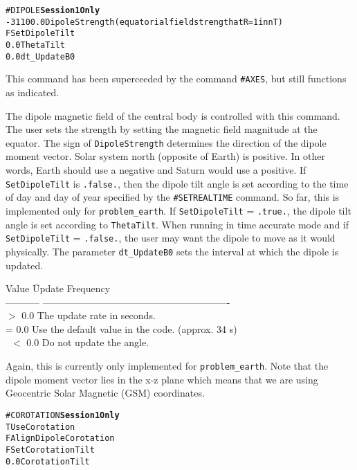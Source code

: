 \begin{alltt}
#DIPOLE    \hfill  {\bf Session 1 Only}
-31100.0               DipoleStrength (equatorial field strength at R=1 in nT)
F                      SetDipoleTilt
0.0                    ThetaTilt
0.0                    dt_UpdateB0
\end{alltt}

This command has been superceeded by the command {\tt \#AXES}, but still functions
as indicated.

The dipole magnetic field of the central body is controlled with this command.
The user sets the strength by setting the magnetic field magnitude at the equator.
The sign of {\tt DipoleStrength} determines the direction of the dipole moment vector.  Solar system
north (opposite of Earth) is positive.  In other words, Earth should use a negative
and Saturn would use a positive.
If {\tt SetDipoleTilt} is {\tt .false.}, then the dipole tilt angle is set
according to the time of day and day of year specified by the {\tt \#SETREALTIME}
command.  So far, this is implemented only for {\tt problem\_earth}.
If {\tt SetDipoleTilt} = {\tt .true.}, the dipole tilt angle is set 
according to {\tt ThetaTilt}.
When running in time accurate mode and if {\tt SetDipoleTilt} = {\tt .false.},
the user may want the dipole to move
as it would physically.  The parameter {\tt dt\_UpdateB0} sets the interval
at which the dipole is updated.
\begin{tabbing}
Value \hspace{0.5in} \= Update Frequency \\
-----------          \> ----------------------------------------------------------\\
 $>$ 0.0	     \> The update rate in seconds. \\
 = 0.0	             \> Use the default value in the code. (approx. 34 s)\\\
 $<$ 0.0             \> Do not update the angle. \\
\end{tabbing}
Again, this is currently only implemented for {\tt problem\_earth}.  Note that
the dipole moment vector lies in the x-z plane which means that we are using
Geocentric Solar Magnetic (GSM) coordinates.
\ \ \\

\begin{alltt}
#COROTATION   \hfill   {\bf Session 1 Only}
T                      UseCorotation
F                      AlignDipoleCorotation 
F                      SetCorotationTilt
0.0                    CorotationTilt
\end{alltt}

